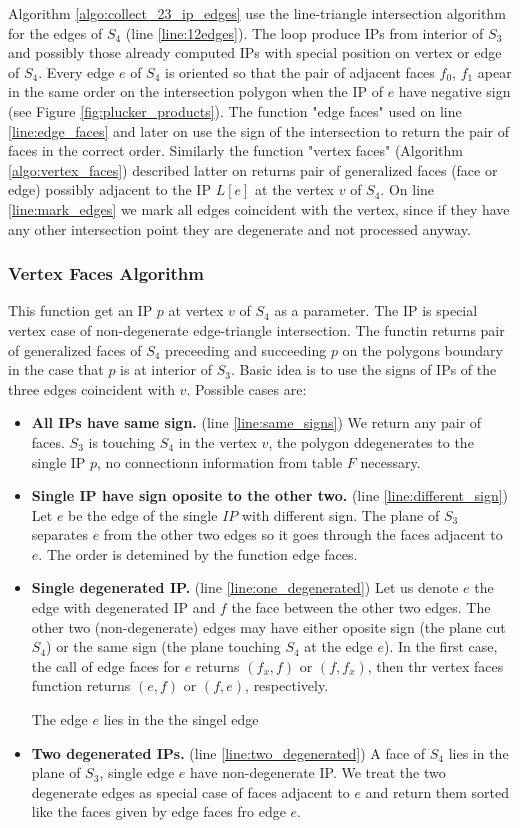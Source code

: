 \documentclass{elsarticle}
\begin{document}
Algorithm \ref{algo:collect_23_ip_edges} use the line-triangle intersection algorithm for the edges of $S_4$ (line \ref{line:12edges}).
The loop produce IPs from interior of $S_3$ and possibly those already computed IPs with special position on vertex or edge of $S_4$. 
Every edge $e$ of $S_4$ is oriented so that the pair of adjacent faces $f_0$, $f_1$ apear in the same order on the intersection polygon when the 
IP of $e$ have negative sign (see Figure \ref{fig:plucker_products}). The function "edge faces" used on line \ref{line:edge_faces} and later on 
use the sign of the intersection to return the pair of faces in the correct order. 
Similarly the function "vertex faces" (Algorithm \ref{algo:vertex_faces}) described latter on
returns pair of generalized faces (face or edge) possibly adjacent to the IP $L[e]$ at the vertex $v$ of $S_4$.
On line \ref{line:mark_edges} we mark all edges coincident with the vertex, since if they have any other intersection point they are degenerate and 
not processed anyway.


\subsubsection{Vertex Faces Algorithm}
This function get an IP $p$ at vertex $v$ of $S_4$ as a parameter. The IP is special vertex case of non-degenerate edge-triangle intersection. 
The functin returns pair of generalized faces of $S_4$ preceeding and succeeding $p$ on the polygons boundary in the case that $p$ is at interior of $S_3$.
Basic idea is to use the signs of IPs of the three edges coincident with $v$. 
Possible cases are:
\begin{itemize}
 \item {\bf All IPs have same sign.} (line \ref{line:same_signs}) We return any pair of faces.  $S_3$ is touching $S_4$ 
 in the vertex $v$, the polygon ddegenerates to the single IP $p$, no connectionn information from table $F$ necessary.
 \item {\bf Single IP have sign oposite to the other two.} (line \ref{line:different_sign}) Let $e$ be the edge of the single $IP$ with different sign. 
 The plane of $S_3$ separates $e$ from the other two edges so it goes through the faces adjacent to $e$. The order is detemined by the function edge faces.
 \item {\bf Single degenerated IP.} (line \ref{line:one_degenerated}) Let us denote $e$ the edge with degenerated IP and $f$ the face between the other two edges.
 The other two (non-degenerate) edges may have either oposite sign (the plane cut $S_4$) or the same sign (the plane touching $S_4$ at the edge $e$).
 In the first case, the call of edge faces for $e$ returns $(f_x,f)$ or $(f,f_x)$, then thr vertex faces function returns $(e, f)$ or $(f, e)$, respectively.
 
 
 The edge $e$ lies in the the singel edge
 \item {\bf Two degenerated IPs.} (line \ref{line:two_degenerated}) A face of $S_4$ lies in the plane of $S_3$, single edge $e$ have non-degenerate IP.
 We treat the two degenerate edges as special case of faces adjacent to $e$ and return them sorted like the faces given by edge faces fro edge $e$.
\end{itemize}
\end{document}
